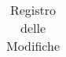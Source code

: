 \begin{center}
\begin{longtable}[c]{|m{}|m{}|m{}|m{}|p{}|}
\caption{Registro delle Modifiche}
\end{longtable}
\end{center}